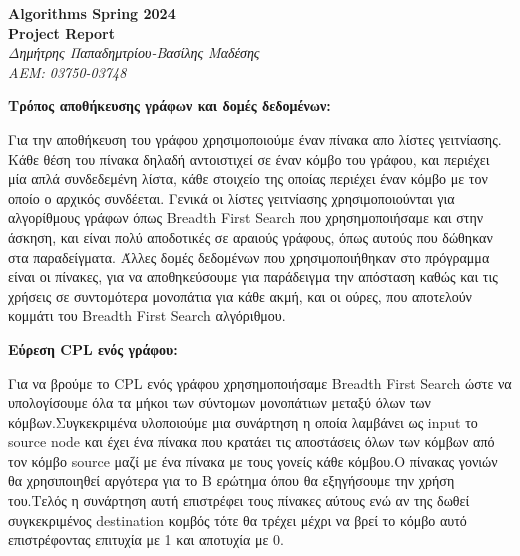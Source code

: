 \documentclass{article}
\begin{document}
\begin{titlepage}
   \begin{center}
   	  \Large\textbf{Algorithms Spring 2024}\\
      \Large\textbf{Project Report}\\
      \large\textit{Δημήτρης Παπαδημτρίου-Βασίλης Μαδέσης}\\
      \large\textit{AEM: 03750-03748}
   \end{center}
\end{titlepage}

\textbf{Τρόπος αποθήκευσης γράφων και δομές δεδομένων:}\bigbreak

Για την αποθήκευση του γράφου χρησιμοποιούμε έναν πίνακα απο λίστες γειτνίασης. Κάθε θέση του πίνακα δηλαδή αντοιστιχεί σε έναν κόμβο του γράφου, και περιέχει μία απλά συνδεδεμένη λίστα, κάθε στοιχείο της οποίας περιέχει 
έναν κόμβο με τον οποίο ο αρχικός συνδέεται. Γενικά οι λίστες γειτνίασης χρησιμοποιούνται για αλγορίθμους γράφων όπως  Breadth First Search που χρησημοποιήσαμε και στην άσκηση,
και είναι πολύ αποδοτικές σε αραιούς γράφους, όπως αυτούς που δώθηκαν στα παραδείγματα.
Άλλες δομές δεδομένων που χρησιμοποιήθηκαν στο πρόγραμμα είναι οι πίνακες, για να αποθηκεύσουμε για παράδειγμα την απόσταση καθώς και τις χρήσεις σε συντομότερα μονοπάτια για κάθε ακμή, και οι ούρες, που αποτελούν κομμάτι
του  Breadth First Search αλγόριθμου.\bigbreak

\textbf{Εύρεση CPL ενός γράφου:}\bigbreak

Για να βρούμε το CPL ενός γράφου χρησημοποιήσαμε Breadth First Search ώστε να υπολογίσουμε όλα τα μήκοι των σύντομων μονοπάτιων μεταξύ όλων των κόμβων.Συγκεκριμένα υλοποιούμε μια συνάρτηση η οποία λαμβάνει ως input το source node και έχει ένα πίνακα που κρατάει τις αποστάσεις όλων των κόμβων από τον κόμβο source μαζί με ένα πίνακα με τους γονείς κάθε κόμβου.Ο πίνακας γονιών θα χρησιποιηθεί αργότερα για το Β ερώτημα όπου θα εξηγήσουμε την χρήση του.Τελός η συνάρτηση αυτή επιστρέφει τους πίνακες αύτους ενώ αν της δωθεί συγκεκριμένος destination κομβός τότε θα τρέχει μέχρι να βρεί το κόμβο αυτό επιστρέφοντας επιτυχία με 1 και αποτυχία με 0.\bigbreak
\end{document}
